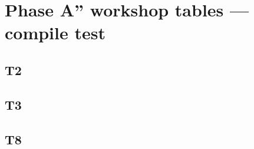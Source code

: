 \documentclass{article}
\begin{document}
\section*{Phase A'' workshop tables --- compile test}
\subsection*{T2}




\subsection*{T3}


\subsection*{T8}


\end{document}
